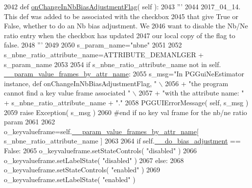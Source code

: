 \begin{DoxyCode}
2042     \textcolor{keyword}{def }\hyperlink{classnegui_1_1pgguineestimator__experimental_1_1PGGuiNeEstimator_aa01a9e1c8464abc2cc421152e7a471c9}{onChangeInNbBiasAdjustmentFlag}( self ):
2043         \textcolor{stringliteral}{'''}
2044 \textcolor{stringliteral}{        2017\_04\_14.  This def was added to be associated with the checkbox}
2045 \textcolor{stringliteral}{        that give True or False, whether to do an Nb bias adjustment.  We }
2046 \textcolor{stringliteral}{        want to disable the Nb/Ne ratio entry when the checkbox has updated}
2047 \textcolor{stringliteral}{        our local copy of the flag to false.}
2048 \textcolor{stringliteral}{        '''}
2049         
2050         s\_param\_name=\textcolor{stringliteral}{"nbne"}
2051 
2052         s\_nbne\_ratio\_attribute\_name=ATTRIBUTE\_DEMANLGER + s\_param\_name
2053 
2054         \textcolor{keywordflow}{if} s\_nbne\_ratio\_attribute\_name \textcolor{keywordflow}{not} \textcolor{keywordflow}{in} self.
      \hyperlink{classnegui_1_1pgguineestimator__experimental_1_1PGGuiNeEstimator_a2073af7a95f481ec2c9ff7e6ebd88cc8}{\_\_param\_value\_frames\_by\_attr\_name}:
2055             s\_msg=\textcolor{stringliteral}{"In PGGuiNeEstimator instance, def onChangeInNbBiasAdjustmentFlag, "} \(\backslash\)
2056                         + \textcolor{stringliteral}{"the program cannot find a key value frame associated "} \(\backslash\)
2057                         + \textcolor{stringliteral}{"with the attribute name: "} + s\_nbne\_ratio\_attribute\_name + \textcolor{stringliteral}{"."}
2058             PGGUIErrorMessage( self, s\_msg )
2059             \textcolor{keywordflow}{raise} Exception( s\_msg )
2060         \textcolor{comment}{#end if no key val frame for the nb/ne ratio param}
2061 
2062         o\_keyvalueframe=self.\hyperlink{classnegui_1_1pgguineestimator__experimental_1_1PGGuiNeEstimator_a2073af7a95f481ec2c9ff7e6ebd88cc8}{\_\_param\_value\_frames\_by\_attr\_name}[ 
      s\_nbne\_ratio\_attribute\_name ]
2063 
2064         \textcolor{keywordflow}{if} self.\hyperlink{classnegui_1_1pgguineestimator__experimental_1_1PGGuiNeEstimator_aec040e3496b5833ae365fbbb4ee94e65}{\_\_do\_bias\_adjustment} == \textcolor{keyword}{False}:
2065             o\_keyvalueframe.setStateControls( \textcolor{stringliteral}{"disabled"} )
2066             o\_keyvalueframe.setLabelState( \textcolor{stringliteral}{"disabled"} )
2067         \textcolor{keywordflow}{else}:
2068             o\_keyvalueframe.setStateControls( \textcolor{stringliteral}{"enabled"} )
2069             o\_keyvalueframe.setLabelState( \textcolor{stringliteral}{"enabled"} )

\end{DoxyCode}
